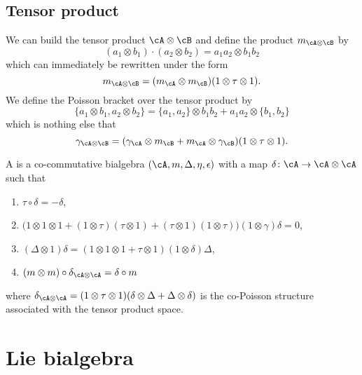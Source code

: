 \subsection{Tensor product}

We can build the tensor product $\cA\otimes\cB$ and define the product $m_{\cA\otimes\cB}$ by
\[
	(a_1\otimes b_1)\cdot(a_2\otimes b_2)=a_1a_2\otimes b_1b_2
\]
which can immediately be rewritten under the form
\begin{equation}
	m_{\cA\otimes\cB}=(m_{\cA}\otimes m_{\cB})(1\otimes\tau \otimes 1).
\end{equation}
We define the Poisson bracket over the tensor product by
\[
	\{ a_1\otimes b_1,a_2\otimes b_2 \}=\{ a_1,a_2 \}\otimes b_1b_2+a_1a_2\otimes\{ b_1,b_2 \}
\]
which is nothing else that
\begin{equation}
	\gamma_{\cA\otimes \cB}=(\gamma_{\cA}\otimes m_{\cB}+m_{\cA}\otimes \gamma_{\cB})(1\otimes \tau\otimes 1).
\end{equation}

\begin{definition}
	A  is a co-commutative bialgebra $(\cA,m,\Delta,\eta,\epsilon)$ with a map $\delta\colon \cA\to \cA\otimes\cA$ such that
	\begin{enumerate}
		\item $\tau\circ\delta=-\delta$,
		\item $\big( 1\otimes 1\otimes 1+(1\otimes\tau)(\tau\otimes 1)+(\tau\otimes 1)(1\otimes\tau) \big)(1\otimes\gamma)\delta=0$,
		\item $(\Delta\otimes 1)\delta=(1\otimes 1\otimes 1+\tau\otimes 1)(1\otimes\delta)\Delta$,
		\item $(m\otimes m)\circ\delta_{\cA\otimes\cA}=\delta\circ m$
	\end{enumerate}
	where $\delta_{\cA\otimes\cA}=(1\otimes\tau\otimes 1)(\delta\otimes\Delta+\Delta\otimes \delta)$ is the co-Poisson structure associated with the tensor product space.
\end{definition}

\section{Lie bialgebra}

